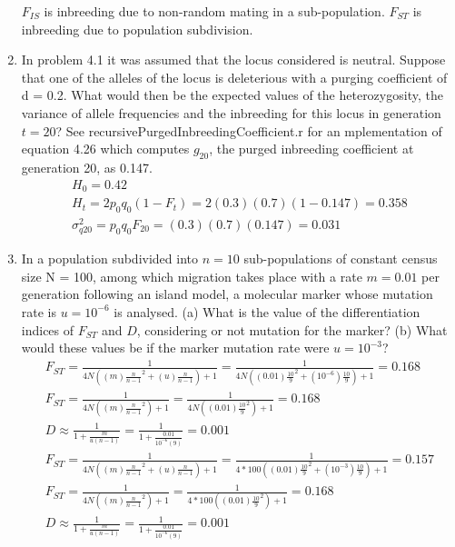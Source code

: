 \documentclass[12pt]{amsart}
\begin{document}
\begin{enumerate}
$F_{IS}$ is inbreeding due to non-random mating in a sub-population. $F_{ST}$ is inbreeding due to population subdivision.

\item In problem 4.1 it was assumed that the locus considered is neutral. Suppose that one of the alleles of the locus is deleterious with a purging coefficient of d = 0.2. What would then be the expected values of the heterozygosity, the variance of allele frequencies and the inbreeding for this locus in generation $t = 20$?
See recursivePurgedInbreedingCoefficient.r for an mplementation of equation 4.26 which computes $g_{20}$, the purged inbreeding coefficient at generation 20, as 0.147. 
\begin{gather*}
H_0 = 0.42 \\
H_t = 2p_0q_0(1-F_t) = 2(0.3)(0.7)(1 - 0.147) = 0.358\\
\sigma^2_{q20} = p_0q_0F_{20} = (0.3)(0.7)(0.147) = 0.031
\end{gather*}

\item In a population subdivided into $n = 10$ sub-populations of constant census size N = 100, among which migration takes place with a rate $m = 0.01$ per generation following an island model, a molecular marker whose mutation rate is $u = 10^{-6}$ is analysed. (a) What is the value of the differentiation indices of $F_{ST}$ and $D$, considering or not mutation for the marker? (b) What would these values be if the marker mutation rate were $u = 10^{-3}$? 
\begin{gather*}
F_{ST}  = \frac{1}{4N((m)\frac{n}{n-1}^2 + (u)\frac{n}{n-1}) + 1} = \frac{1}{4N((0.01)\frac{10}{9}^2 + (10^{-6})\frac{10}{9}) + 1} = 0.168 \\
F_{ST} =  \frac{1}{4N((m)\frac{n}{n-1}^2) + 1} = \frac{1}{4N((0.01)\frac{10}{9}^2)+ 1} = 0.168 \\
D \approx \frac{1}{1 + \frac{m}{u(n-1)}} = \frac{1}{1 + \frac{0.01}{10^{-6}(9)}} = 0.001\\
F_{ST}  = \frac{1}{4N((m)\frac{n}{n-1}^2 + (u)\frac{n}{n-1}) + 1} = \frac{1}{4*100((0.01)\frac{10}{9}^2 + (10^{-3})\frac{10}{9}) + 1} = 0.157 \\
F_{ST} =  \frac{1}{4N((m)\frac{n}{n-1}^2) + 1} = \frac{1}{4*100((0.01)\frac{10}{9}^2)+ 1} = 0.168 \\
D \approx \frac{1}{1 + \frac{m}{u(n-1)}} = \frac{1}{1 + \frac{0.01}{10^{-6}(9)}} = 0.001\\
\end{gather*}


\end{enumerate}
\end{document}
